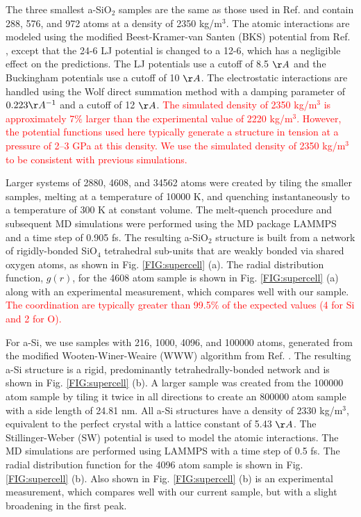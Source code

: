 \documentclass[aps,prb,onecolumn,preprint,superscriptaddress,footinbib,amsmath,amssymb,floatfix]{revtex4}
\begin{document}
The three smallest a-SiO$_2$ samples are the same as those used 
in Ref.  
and contain 288, 576, and 972 atoms at a density of 2350 kg/m$^3$.  
The atomic interactions are modeled using 
the modified Beest-Kramer-van Santen (BKS) potential
\cite{van_Beest_force_1990,kramer_interatomic_1991}
from Ref. 
, except that the 24-6 
LJ potential\cite{guissani_numerical_1996} 
is changed to a 12-6, 
which has a negligible effect on the predictions.  
The LJ potentials use a cutoff of 8.5 $\AA$ and the Buckingham 
potentials use a cutoff of 10 $\AA$. 
The electrostatic interactions are handled using the Wolf direct 
summation method with 
a damping parameter of $0.223 \AA^{-1}$ and a cutoff 
of 12 $\AA$.\cite{wolf_exact_1999} 
\textcolor{red}{
The simulated density of 2350 kg/m$^3$ is approximately 
7$\%$ larger than the experimental value of 2220 kg/m$^3$.
\cite{kaviany_principles_2001} 
However, the potential functions used here typically
generate a structure in tension at a pressure of 2–3 GPa
at this density.\cite{mcgaughey_thermal_2004} 
We use the simulated density of 2350 kg/m$^3$ to be consistent 
with previous simulations.
}

Larger systems of 2880, 4608, and 34562 atoms were created by 
tiling the smaller samples, melting at a temperature of 10000 K,  
and quenching instantaneously to a temperature of 300 K at 
constant volume. 
The melt-quench procedure and subsequent MD simulations were 
performed using the MD package 
LAMMPS and a time step of 0.905 fs.\cite{plimpton_fast_1995} 
The resulting a-SiO$_2$ structure is built from a network 
of rigidly-bonded SiO$_4$ tetrahedral sub-units that are weakly 
bonded via shared oxygen atoms, 
as shown in Fig. \ref{FIG:supercell} (a). 
The radial distribution function, 
$g(r)$, for the 4608 atom 
sample is shown in Fig. \ref{FIG:supercell} (a) along with an 
experimental measurement,\cite{lorch_neutron_1969} which 
compares well with our sample. 
\textcolor{red}{
The coordination are typically greater than 99.5$\%$ of the 
expected values (4 for Si and 2 for O).\cite{mcgaughey_thermal_2004}
}

For a-Si, we use samples 
with 216, 1000, 4096, and 100000 atoms, generated from the 
modified Wooten-Winer-Weaire (WWW) algorithm 
from Ref. . 
The resulting a-Si structure is a rigid, predominantly 
tetrahedrally-bonded network and is shown in 
Fig. \ref{FIG:supercell} (b).  
A larger sample was created from the 100000 atom sample 
by tiling it twice in all directions to create an 
800000 atom sample with a side length of 24.81 nm.  
All a-Si structures have a density of 2330 kg/m$^3$, 
equivalent to the perfect 
crystal with a lattice constant of 5.43 $\AA$. 
The Stillinger-Weber (SW) potential is used to model the atomic 
interactions.\cite{stillinger_computer_1985} The MD simulations 
are performed using LAMMPS with a time step of 0.5 fs. 
The radial distribution function for the 4096 atom 
sample is shown in Fig. \ref{FIG:supercell} (b). 
Also shown in Fig. \ref{FIG:supercell} (b) is an experimental 
measurement,\cite{laaziri_high-energy_1999} 
which compares well with our current sample, but with a slight 
broadening in the first peak.
\end{document}
